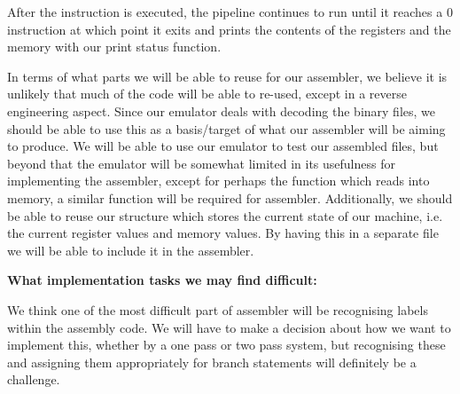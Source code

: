 \documentclass{article}
\newcommand{\tmtextbf}[1]{{\bfseries{#1}}}
\begin{document}
After the instruction is executed, the pipeline continues to run until it
reaches a 0 instruction at which point it exits and prints the contents of the
registers and the memory with our print status function.\newline

In terms of what parts we will be able to reuse for our
assembler, we believe it is unlikely that much of the code will be able to
re-used, except in a reverse engineering aspect. Since our emulator deals with
decoding the binary files, we should be able to use this as a basis/target of
what our assembler will be aiming to produce. We will be able to use our
emulator to test our assembled files, but beyond that the emulator will be
somewhat limited in its usefulness for implementing the assembler, except for
perhaps the function which reads into memory, a similar function will be
required for assembler. Additionally, we should be able to reuse our structure 
which stores the current state of our machine, i.e. the current register values
and memory values. By having this in a separate file we will be able to include
it in the assembler.\newline



\tmtextbf{What implementation tasks we may find difficult:}

We think one of the most difficult part of assembler will be recognising
labels within the assembly code. We will have to make a decision about how we
want to implement this, whether by a one pass or two pass system, but
recognising these and assigning them appropriately for branch statements will
definitely be a challenge.
\end{document}
